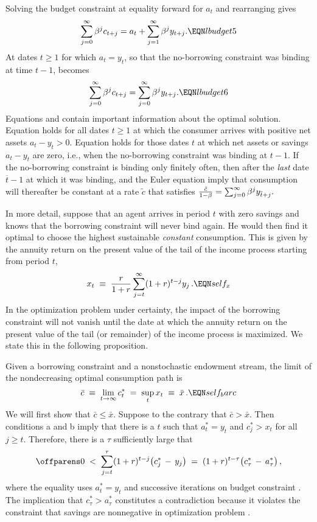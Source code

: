 Solving the
budget constraint  at equality
forward for $a_t$ and rearranging gives
$$ \sum_{j=0}^\infty \beta^j c_{t+j} = a_t + \sum_{j=1}^\infty
  \beta^j y_{t+j}.   \EQN lbudget5 $$
At dates $t\geq 1$ for which $a_t = y_t$,  so that the no-borrowing constraint
was binding at time $t-1$,   becomes
$$\sum_{j=0}^\infty \beta^j c_{t+j} = \sum_{j=0}^\infty \beta^j y_{t+j}.
\EQN lbudget6 $$
Equations  and  contain important information
about the  optimal solution.
Equation  holds for all dates  $t \geq 1$  at which
the consumer arrives
with positive net assets $a_t - y_t >0$.  Equation
 holds for those dates $t$ at which net assets
or savings
$a_t - y_t$
are zero, i.e., when the no-borrowing constraint was
binding at $t-1$.   If the no-borrowing constraint is binding
only finitely often, then after the {\it last\/} date $\overline t -1$
at which it was binding,  and the Euler equation
 imply that consumption will thereafter be constant
at a rate $\tilde c$ that satisfies
${\tilde c \over 1 -\beta } = \sum_{j=0}^\infty \beta^j
y_{{\overline t}+j}.$

In more detail,
suppose that an agent arrives in period $t$ with zero savings and
knows that the borrowing constraint will never bind again. He
would then find it optimal to choose the highest sustainable
{\it constant\/} consumption.  This is given by the annuity return on
the present value of the tail of the income process starting from period $t$,
$$
x_t\;\equiv\; {r \over 1+r} \sum_{j=t}^\infty (1+r)^{t-j} y_{j}\,.
\EQN self_x $$
In the optimization problem under certainty, the
impact of the borrowing
constraint will not vanish until the date at which
the annuity return on  the present value of the tail (or remainder) of the
income process is maximized. We state this in the following proposition.

\medskip
{} Given a borrowing constraint and a nonstochastic
endowment stream, the limit of
the nondecreasing optimal consumption path is
$$
\bar c \;\equiv\; \lim_{t \rightarrow \infty} c^*_t
\;=\; \sup_t x_t \;\equiv\;\bar x \,.              \EQN self_barc
$$
\medskip
{}
We will first show that $\bar c \leq \bar x$. Suppose to the contrary
that $\bar c > \bar x$. Then conditions a and b imply that
there is a $t$ such that $a^*_t=y_t$ and $c^*_{j}>x_t$ for all
$j\geq t$. Therefore, there is a $\tau$ sufficiently large that
$$
\offparens
0 \;<\; \sum_{j=t}^\tau (1+r)^{t-j}
\bigl(c^*_{j} \,-\, y_{j} \bigr) \;=\;
(1+r)^{t-\tau} \bigl( c^*_{\tau} \,-\, a^*_{\tau} \bigr)\,,
$$
\autoparens
where the equality uses $a^*_t=y_t$ and successive iterations on
budget constraint . The implication that
$c^*_{\tau} > a^*_{\tau}$
constitutes a contradiction because it violates the constraint that
savings are nonnegative in optimization problem .

